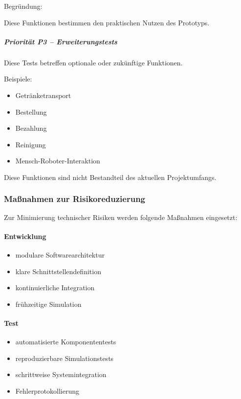 \documentclass[
  a4paper,
  12pt,
  DIV=12,        %
  parskip=half,  %
  headings=small %
]{scrartcl}
\theoremstyle{definition}
\providecommand{\tightlist}{%
  \setlength{\itemsep}{0pt}\setlength{\parskip}{0pt}}
\theoremstyle{definition}
\begin{document}
Begründung:

Diese Funktionen bestimmen den praktischen Nutzen des Prototyps.

\subparagraph{Priorität P3 --
Erweiterungstests}\label{priorituxe4t-p3-erweiterungstests}

Diese Tests betreffen optionale oder zukünftige Funktionen.

Beispiele:

\begin{itemize}
\tightlist
\item
  Getränketransport
\item
  Bestellung
\item
  Bezahlung
\item
  Reinigung
\item
  Mensch-Roboter-Interaktion
\end{itemize}

Diese Funktionen sind nicht Bestandteil des aktuellen Projektumfangs.

\subsubsection{Maßnahmen zur
Risikoreduzierung}\label{mauxdfnahmen-zur-risikoreduzierung}

Zur Minimierung technischer Risiken werden folgende Maßnahmen
eingesetzt:

\paragraph{Entwicklung}\label{entwicklung}

\begin{itemize}
\tightlist
\item
  modulare Softwarearchitektur
\item
  klare Schnittstellendefinition
\item
  kontinuierliche Integration
\item
  frühzeitige Simulation
\end{itemize}

\paragraph{Test}\label{test}

\begin{itemize}
\tightlist
\item
  automatisierte Komponententests
\item
  reproduzierbare Simulationstests
\item
  schrittweise Systemintegration
\item
  Fehlerprotokollierung
\end{itemize}
\end{document}
